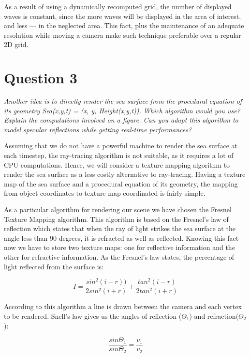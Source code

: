 \documentclass{article}
\begin{document}
As a result of using a dynamically recomputed grid, the number of
displayed waves is constant, since the more waves will be displayed in the
area of interest, and less --- in the neglected area. This fact, plus the
maintenance of an adequate resolution while moving a camera make such
technique preferable over a regular 2D grid.

\section{Question 3}

\emph{Another idea is to directly render the sea surface from the
procedural equation of its geometry Sea(x,y,t) = (x, y, Height(x,y,t)).
Which algorithm would you use? Explain the computations involved on a
figure. Can you adapt this algorithm to model specular reflections while
getting real-time performances?}

Assuming that we do not have a powerful machine to render the sea
surface at each timestep, the ray-tracing algorithm is not
suitable, as it requires a lot of CPU computations. Hence, we will
consider a texture mapping algorithm to render the sea surface as a less
costly alternative to ray-tracing. Having a texture map of the sea
surface and a procedural equation of its geometry, the mapping from
object coordinates to texture map coordinated is fairly simple. 

As a particular algorithm for rendering our scene we have chosen the Fresnel
Texture Mapping algorithm\cite{fresnel}. This algorithm is based on the Fresnel's law
of reflection which states that when the ray of light strikes the
sea surface at the angle less than 90 degrees, it is refracted as well
as reflected. Knowing this fact now we have to store two texture maps:
one for reflective information and the other for refractive information.
As the Fresnel's law states, the percentage of light reflected from the
surface is:

\begin{equation}
  I = \frac{sin^2(i-r))}{2sin^2(i+r)} + \frac{tan^2(i-r)}{2tan^2(i+r)}
\end{equation}

According to this algorithm a line is drawn between the camera and each
vertex to be rendered. Snell's law gives us the angles of
reflection ($\Theta_1$) and refraction($\Theta_2$): 

\begin{equation}
  \frac{sin\Theta_1}{sin\Theta_2} = \frac{v_1}{v_2}
\end{equation}
\end{document}
